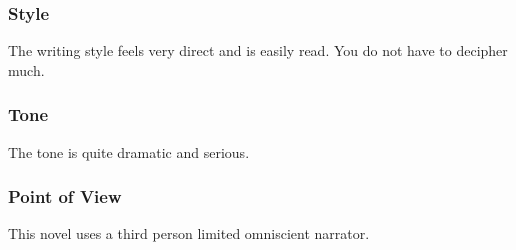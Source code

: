 \subsubsection{Style}

The writing style feels very direct and is easily read. You do not have to decipher much.

\subsubsection{Tone}

The tone is quite dramatic and serious.

\subsubsection{Point of View}

This novel uses a third person limited omniscient narrator.

